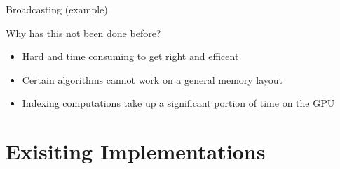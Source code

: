 \documentclass[utf8x,xcolor=pdftex,dvipsnames,table]{beamer}
\begin{document}
\begin{frame}{Broadcasting (example)}
\begin{center}
\end{center}
\end{frame}

\begin{frame}{Why has this not been done before?}
\begin{itemize}
\item Hard and time consuming to get right and efficent
\item Certain algorithms cannot work on a general memory layout
\item Indexing computations take up a significant portion of time on the GPU
\end{itemize}
\end{frame}

\section{Exisiting Implementations}
\end{document}
